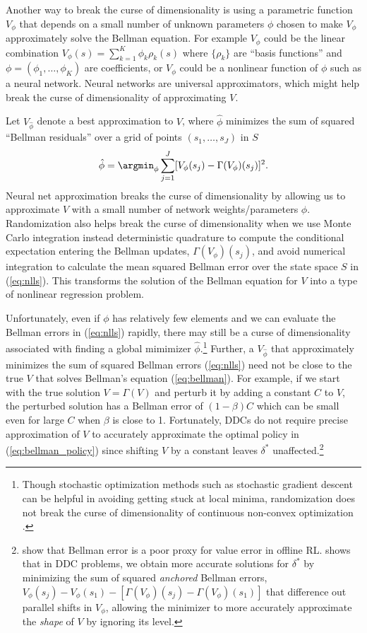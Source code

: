 Another way to break the curse of dimensionality \citep{BD:1959} is using a parametric function $V_\phi$  
that depends on a small number of unknown parameters $\phi$ chosen to make $V_\phi$ approximately
solve the Bellman equation. For example $V_\phi$ could be the linear combination
$V_\phi(s)=\sum_{k=1}^K \phi_k \rho_k(s)$ where $\{\rho_k\}$ are ``basis functions'' and $\phi=(\phi_1,\ldots,\phi_K)$ are
coefficients, or $V_\phi$ could be a nonlinear function of $\phi$ such as a neural network.
Neural networks are universal approximators, which might help break the curse of dimensionality of approximating $V$.

Let $V_{\hat\phi}$ denote 
a best approximation to $V$, where $\hat\phi$  
minimizes the sum of squared ``Bellman residuals'' over a grid of points $(s_1,\ldots,s_J)$ in $S$
\begin{equation}
      \hat\phi = \argmin_{\phi} \sum_{j=1}^J [V_\phi(s_j)- \Gamma(V_\phi)(s_j)]^2.
\label{eq:nlls}
\end{equation}
Neural net approximation breaks the curse of dimensionality by allowing us to approximate $V$ with a small number
of network weights/parameters $\phi$.  Randomization also helps break the curse of dimensionality when we
use  Monte Carlo integration instead deterministic quadrature to compute the conditional expectation entering the Bellman updates,  
$\Gamma(V_\phi)(s_j)$, and avoid numerical integration to calculate the mean squared Bellman error over the state
space $S$ in (\ref{eq:nlls}). This transforms the solution of the Bellman equation for $V$ into a type of nonlinear regression problem.

Unfortunately, even if $\phi$ has relatively few elements and we can evaluate the Bellman errors in (\ref{eq:nlls})
rapidly, there may still be a curse of dimensionality associated with finding a global mimimizer $\hat\phi$.\footnote{\footnotesize 
Though stochastic optimization methods such as stochastic gradient descent can be helpful in avoiding getting stuck
at local minima, randomization does not break the curse of dimensionality of continuous non-convex optimization \citep{yn:1976}.}
Further, a $V_{\hat\phi}$ that approximately minimizes the sum of squared Bellman errors (\ref{eq:nlls})
need not be close to the true $V$ that solves Bellman's equation (\ref{eq:bellman}). For example, if we start with 
the true solution $V=\Gamma(V)$ and perturb it by adding a constant $C$ to $V$, the perturbed solution has a Bellman error of
$(1-\beta)C$ which can be small even for large $C$ when $\beta$ is close to 1.
Fortunately, DDCs do not require
precise approximation of $V$ to accurately approximate the optimal policy in  (\ref{eq:bellman_policy}) since shifting $V$
by a constant leaves $\delta^*$ unaffected.\footnote{\footnotesize \citet{fujimoto22a} show that Bellman error is a poor proxy for value error in offline RL. 
\citet{Nguyen:2025} shows that in DDC problems, we obtain
more accurate solutions for $\delta^*$ by minimizing the sum of squared {\it anchored\/} Bellman errors, 
$V_\phi(s_j)-V_\phi(s_1)-[\Gamma(V_\phi)(s_j)-\Gamma(V_\phi)(s_1)]$ that difference out
parallel shifts in $V_\phi$, allowing the minimizer to more accurately approximate the {\it shape\/} of $V$ by ignoring its level.}


